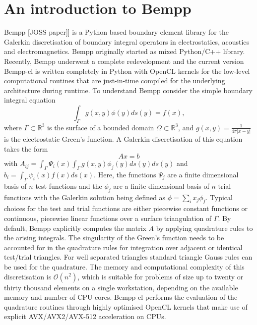\section{An introduction to Bempp}
Bempp [JOSS paper]] is a Python based boundary element library for the Galerkin discretisation of boundary integral operators in electrostatics, acoustics and electromagnetics. Bempp originally started as mixed Python/C++ library. Recently, Bempp underwent a complete redevelopment and the current version Bempp-cl is written completely in Python with OpenCL kernels for the low-level computational routines that are just-in-time compiled for the underlying architecture during runtime. To understand Bempp consider the simple boundary integral equation
$$
\int_{\Gamma}g(x, y) \phi(y)ds(y) = f(x),
$$
where $\Gamma\subset\mathbb{R}^3$ is the surface of a bounded domain $\Omega\subset\mathbb{R}^3$, and $g(x, y) = \frac{1}{4\pi|x -y|}$ is the electrostatic Green's function. A Galerkin discretisation of this equation takes the form
$$
Ax = b
$$
with $A_{ij} = \int_{\Gamma}\Psi_i(x)\int_{\Gamma}g(x, y)\phi_j(y)ds(y)ds(y)$ and $b_i = \int_{\Gamma}\psi_i(x)f(x)ds(x)$. Here, the functions $\Psi_j$ are a finite dimensional basis of $n$ test functions and the $\phi_j$ are a finite dimensional basis of $n$ trial functions with the Galerkin solution being defined as $\phi=\sum_{i}x_j\phi_j$. Typical choices for the test and trial functions are either piecewise constant functions or continuous, piecewise linear functions over a surface triangulation of $\Gamma$. By default, Bempp explicitly computes the matrix $A$ by applying quadrature rules to the arising integrals. The singularity of the Green's function needs to be accounted for in the quadrature rules for integration over adjacent or identical test/trial triangles. For well separated triangles standard triangle Gauss rules can be used for the quadrature. The memory and computational complexity of this discretisation is $\mathcal{O}(n^2)$, which is suitable for problems of size up to twenty or thirty thousand elements on a single workstation, depending on the available memory and number of CPU cores. Bempp-cl performs the evaluation of the quadrature routines through highly optimised OpenCL kernels that make use of explicit AVX/AVX2/AVX-512 acceleration on CPUs.

